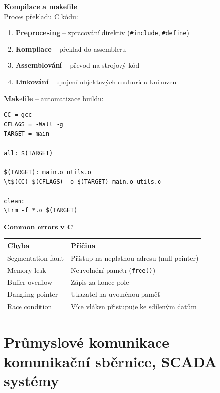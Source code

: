 \documentclass[a4paper,10pt]{article}
\begin{document}
\begin{vysvetlenibox}
\textbf{Kompilace a makefile}\\
Proces překladu C kódu:
\begin{enumerate}[noitemsep, leftmargin=1.4em, topsep=4pt]
    \item \textbf{Preprocesing} -- zpracování direktiv (\texttt{\#include}, \texttt{\#define})
    \item \textbf{Kompilace} -- překlad do assembleru
    \item \textbf{Assemblování} -- převod na strojový kód
    \item \textbf{Linkování} -- spojení objektových souborů a knihoven
\end{enumerate}

\textbf{Makefile} -- automatizace buildu:
\begin{vzorcebox}
\begin{verbatim}
CC = gcc
CFLAGS = -Wall -g
TARGET = main

all: $(TARGET)

$(TARGET): main.o utils.o
\t$(CC) $(CFLAGS) -o $(TARGET) main.o utils.o

clean:
\trm -f *.o $(TARGET)
\end{verbatim}
\end{vzorcebox}

\textbf{Common errors v C}
\begin{center}
\begin{tabularx}{0.95\linewidth}{@{} l X @{}}
    \toprule
    \textbf{Chyba} & \textbf{Příčina} \\
    \midrule
    Segmentation fault & Přístup na neplatnou adresu (null pointer) \\
    Memory leak & Neuvolnění paměti (\texttt{free()}) \\
    Buffer overflow & Zápis za konec pole \\
    Dangling pointer & Ukazatel na uvolněnou paměť \\
    Race condition & Více vláken přistupuje ke sdíleným datům \\
    \bottomrule
\end{tabularx}
\end{center}
\end{vysvetlenibox}

\section{Průmyslové komunikace -- komunikační sběrnice, SCADA systémy}
\end{document}
